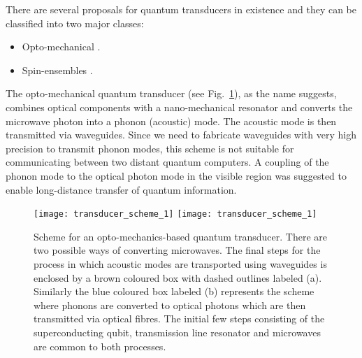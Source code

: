 There are several proposals for quantum transducers in existence and they can be classified into two major classes:
\begin{itemize}
	\item Opto-mechanical \cite{bib:rabl2010quantum, bib:barzanjeh2011entangling, bib:bochmann2013nanomechanical, bib:didier2014quantum, bib:schuetz2015universal, bib:shumeiko2016quantum, bib:stannigel2010optomechanical}.
	\item Spin-ensembles \cite{bib:imamouglu2009cavity, bib:blum2015interfacing}.
\end{itemize}

The opto-mechanical quantum transducer (see Fig.~\ref{fig:opto_mechanics_transducer}), as the name suggests, combines optical components with a nano-mechanical resonator and converts the microwave photon into a phonon (acoustic) mode. The acoustic mode is then transmitted via waveguides. Since we need to fabricate waveguides with very high precision to transmit phonon modes, this scheme is not suitable for communicating between two distant quantum computers. A coupling of the phonon mode to the optical photon mode in the visible region was suggested to enable long-distance transfer of quantum information.

\begin{figure}[!htbp]
\pubmode
\texttt{[image: transducer\_scheme\_1]}
\else
\texttt{[image: transducer\_scheme\_1]}
\fi
\caption{Scheme for an opto-mechanics-based quantum transducer. There are two possible ways of converting microwaves. The final steps for the process in which acoustic modes are transported using waveguides is enclosed by a brown coloured box with dashed outlines labeled (a). Similarly the blue coloured box labeled (b) represents the scheme where phonons are converted to optical photons which are then transmitted via optical fibres. The initial few steps consisting of the superconducting qubit, transmission line resonator and microwaves are common to both processes.}\label{fig:opto_mechanics_transducer}
\end{figure}

